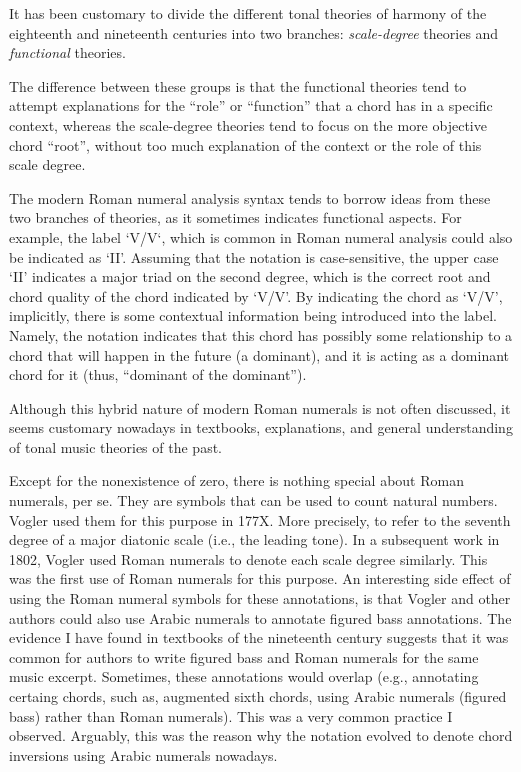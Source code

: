 It has been customary to divide the different tonal theories of harmony of the eighteenth and nineteenth centuries into two branches: \emph{scale-degree} theories and \emph{functional} theories.

The difference between these groups is that the functional theories tend to attempt explanations for the ``role'' or ``function'' that a chord has in a specific context, whereas the scale-degree theories tend to focus on the more objective chord ``root'', without too much explanation of the context or the role of this scale degree.

The modern Roman numeral analysis syntax tends to borrow ideas from these two branches of theories, as it sometimes indicates functional aspects.
For example, the label `V/V`, which is common in Roman numeral analysis could also be indicated as `II'.
Assuming that the notation is case-sensitive, the upper case `II' indicates a major triad on the second degree, which is the correct root and chord quality of the chord indicated by `V/V'.
By indicating the chord as `V/V', implicitly, there is some contextual information being introduced into the label.
Namely, the notation indicates that this chord has possibly some relationship to a chord that will happen in the future (a dominant), and it is acting as a dominant chord for it (thus, ``dominant of the dominant'').

Although this hybrid nature of modern Roman numerals is not often discussed, it seems customary nowadays in textbooks, explanations, and general understanding of tonal music theories of the past.


Except for the nonexistence of zero, there is nothing special about Roman numerals, per se.
They are symbols that can be used to count natural numbers.
Vogler used them for this purpose in 177X.
More precisely, to refer to the seventh degree of a major diatonic scale (i.e., the leading tone).
In a subsequent work in 1802, Vogler used Roman numerals to denote each scale degree similarly.
This was the first use of Roman numerals for this purpose.
An interesting side effect of using the Roman numeral symbols for these annotations, is that Vogler and other authors could also use Arabic numerals to annotate figured bass annotations.
The evidence I have found in textbooks of the nineteenth century suggests that it was common for authors to write figured bass and Roman numerals for the same music excerpt.
Sometimes, these annotations would overlap (e.g., annotating certaing chords, such as, augmented sixth chords, using Arabic numerals (figured bass) rather than Roman numerals).
This was a very common practice I observed.
Arguably, this was the reason why the notation evolved to denote chord inversions using Arabic numerals nowadays.

